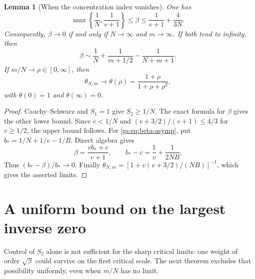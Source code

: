 \documentclass[11pt,a4paper]{article}
\numberwithin{equation}{section}
\newtheorem{lemma}[theorem]{Lemma}
\theoremstyle{definition}
\theoremstyle{remark}
\begin{document}
\begin{lemma}[When the concentration index vanishes]\label{gs:lem:beta-small}
One has
\begin{equation}\label{gs:eq:beta-bounds}
 \max\left\{\frac1N,\frac1{v+1}\right\}
 \le\beta\le\frac1{v+1}+\frac4{3N}.
\end{equation}
Consequently, $\beta\to0$ if and only if $N\to\infty$ and $m\to\infty$.
If both tend to infinity, then
\begin{equation}\label{gs:eq:beta-asymp}
 \beta\sim\frac1N+\frac1{m+1/2}-\frac1{N+m+1}.
\end{equation}
If $m/N\to\rho\in[0,\infty]$, then
\begin{equation}\label{gs:eq:theta-rho}
 \theta_{N,m}\longrightarrow
 \theta(\rho)=\frac{1+\rho}{1+\rho+\rho^2},
\end{equation}
with $\theta(0)=1$ and $\theta(\infty)=0$.
\end{lemma}
\begin{proof}
Cauchy--Schwarz and $S_1=1$ give $S_2\ge1/N$. The exact formula for
$\beta$ gives the other lower bound. Since $c<1/N$ and
$(v+3/2)/(v+1)\le4/3$ for $v\ge1/2$, the upper bound follows.
For \eqref{gs:eq:beta-asymp}, put
$b_*=1/N+1/v-1/B$. Direct algebra gives
\[
 \beta=\frac{vb_*+c}{v+1},\qquad
 b_*-c=\frac1v+\frac1{2NB}.
\]
Thus $(b_*-\beta)/b_*\to0$. Finally
$\theta_{N,m}=[1+v(v+3/2)/(NB)]^{-1}$, which gives the asserted limits.
\end{proof}

\section{A uniform bound on the largest inverse zero}
\label{gs:sec:majorant}

Control of $S_2$ alone is not sufficient for the sharp critical limits:
one weight of order $\sqrt\beta$ could survive on the first critical scale.
The next theorem excludes that possibility uniformly, even when $m/N$
has no limit.
\end{document}
